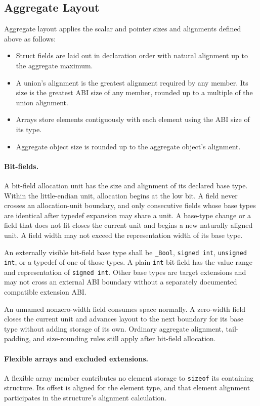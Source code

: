 \documentclass[10pt,twoside]{article}
\begin{document}
\subsection{Aggregate Layout}
Aggregate layout applies the scalar and pointer sizes and alignments defined
above as follows:
\begin{itemize}
\item Struct fields are laid out in declaration order with natural alignment up to the aggregate maximum.
\item A union's alignment is the greatest alignment required by any member. Its size is the greatest ABI size of any
member, rounded up to a multiple of the union alignment.
\item Arrays store elements contiguously with each element using the ABI size of its type.
\item Aggregate object size is rounded up to the aggregate object's alignment.
\end{itemize}

\paragraph{Bit-fields.}
A bit-field allocation unit has the size and alignment of its declared base
type. Within the little-endian unit, allocation begins at the low bit. A field
never crosses an allocation-unit boundary, and only consecutive fields whose
base types are identical after typedef expansion may share a unit. A base-type
change or a field that does not fit closes the current unit and begins a new
naturally aligned unit. A field width may not exceed the representation width
of its base type.

An externally visible bit-field base type shall be \texttt{\_Bool},
\texttt{signed int}, \texttt{unsigned int}, or a typedef of one of those types.
A plain \texttt{int} bit-field has the value range and representation of
\texttt{signed int}. Other base types are target extensions and may not cross
an external ABI boundary without a separately documented compatible extension
ABI.

An unnamed nonzero-width field consumes space normally. A zero-width field
closes the current unit and advances layout to the next boundary for its base
type without adding storage of its own. Ordinary aggregate alignment,
tail-padding, and size-rounding rules still apply after bit-field allocation.

\paragraph{Flexible arrays and excluded extensions.}
A flexible array member contributes no element storage to \texttt{sizeof} its
containing structure. Its offset is aligned for the element type, and that
element alignment participates in the structure's alignment calculation.
\end{document}
